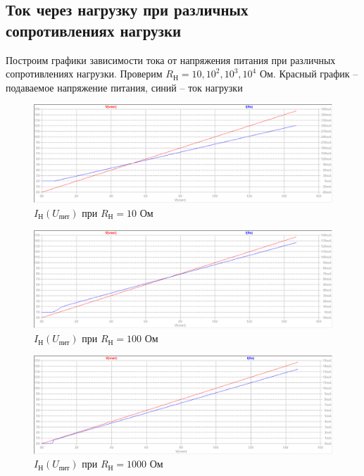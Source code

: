\documentclass[a4paper, 12pt]{article}
\begin{document}
    \subsection{Ток через нагрузку при различных сопротивлениях нагрузки}
    Построим графики зависимости тока от напряжения питания при различных сопротивлениях нагрузки.
    Проверим $R_\text{Н}=10,10^2,10^3,10^4$ Ом. Красный график -- подаваемое напряжение питания,
    синий -- ток нагрузки
    \begin{figure}[H]
        \centering
        \includegraphics[scale=0.46]{1task_Iн(Vпит)_Rн10.png}
        \captionsetup{skip=0pt}
        \caption{$I_\text{Н}\left( U_\text{пит} \right)$ при $R_\text{Н}=10$ Ом}
        \label{fig:1task_InVlR10}
    \end{figure}
    \begin{figure}[H]
        \centering
        \includegraphics[scale=0.46]{1task_Iн(Vпит)_Rн100.png}
        \captionsetup{skip=0pt}
        \caption{$I_\text{Н}\left( U_\text{пит} \right)$ при $R_\text{Н}=100$ Ом}
        \label{fig:1task_InVlR100}
    \end{figure}
    \begin{figure}[H]
        \centering
        \includegraphics[scale=0.46]{1task_Iн(Vпит)_Rн1000.png}
        \captionsetup{skip=0pt}
        \caption{$I_\text{Н}\left( U_\text{пит} \right)$ при $R_\text{Н}=1000$ Ом}
        \label{fig:1task_InVlR1000}
    \end{figure}
\end{document}
